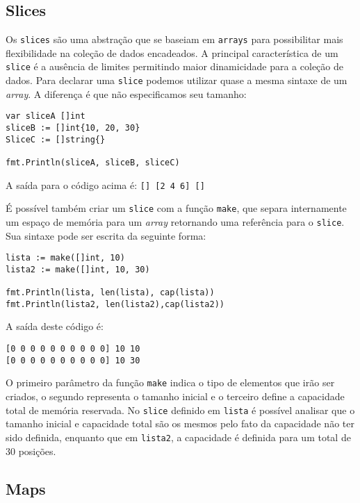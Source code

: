 \documentclass{SBCbookchapter}
\begin{document}
\subsection{Slices}

Os \texttt{slices} são uma abstração que se baseiam em \texttt{arrays} para possibilitar mais flexibilidade na coleção de dados encadeados. A principal característica de um \texttt{slice} é a ausência de limites permitindo maior dinamicidade para a coleção de dados. Para declarar uma \texttt{slice} podemos utilizar quase a mesma sintaxe de um \textit{array}. A diferença é que não especificamos seu tamanho:


\begin{lstlisting}
var sliceA []int
sliceB := []int{10, 20, 30}
SliceC := []string{}

fmt.Println(sliceA, sliceB, sliceC)
\end{lstlisting}

A saída para o código acima é: \texttt{[] [2 4 6] []}

É possível também criar um \texttt{slice} com a função \texttt{make}, que separa internamente um espaço de memória para um \textit{array} retornando uma referência para o \texttt{slice}. Sua sintaxe pode ser escrita da seguinte forma:

\begin{lstlisting}
lista := make([]int, 10)
lista2 := make([]int, 10, 30)

fmt.Println(lista, len(lista), cap(lista))
fmt.Println(lista2, len(lista2),cap(lista2))
\end{lstlisting}

A saída deste código é:

\noindent\texttt{[0 0 0 0 0 0 0 0 0 0] 10 10}\\
\texttt{[0 0 0 0 0 0 0 0 0 0] 10 30}

O primeiro parâmetro da função \texttt{make} indica o tipo de elementos que irão ser criados, o segundo representa o tamanho inicial e o terceiro define a capacidade total de memória reservada. No \texttt{slice} definido em \texttt{lista} é possível analisar que o tamanho inicial e capacidade total são os mesmos pelo fato da capacidade não ter sido definida, enquanto que em \texttt{lista2}, a capacidade é definida para um total de 30 posições.

\subsection{Maps}
\end{document}
